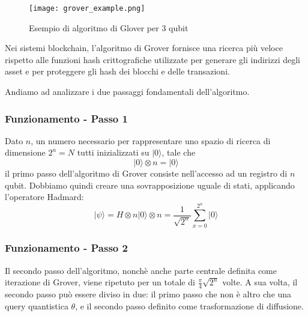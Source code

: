 \begin{figure}[h]
  \centering
  \texttt{[image: grover\_example.png]}
  \caption{Esempio di algoritmo di Glover per 3 qubit}
  \label{fig:grover_example}
\end{figure}

Nei sistemi blockchain, l'algoritmo di Grover fornisce una ricerca più veloce rispetto alle funzioni hash crittografiche utilizzate per generare gli indirizzi degli asset e per proteggere gli hash dei blocchi e delle transazioni.

Andiamo ad analizzare i due passaggi fondamentali dell'algoritmo.
\subsubsection{Funzionamento - Passo 1}
Dato \(n\), un numero necessario per rappresentare uno spazio di ricerca di dimensione \(2^n = N\) tutti inizializzati su \(|0\rangle\), tale che
\[ |0\rangle \otimes n = |0\rangle \]
il primo passo dell'algoritmo di Grover consiste nell'accesso ad un registro di \(n\) qubit. Dobbiamo quindi creare una sovrapposizione uguale di stati, applicando l'operatore Hadmard:
\[ |\psi\rangle = H \otimes n |0\rangle \otimes n = \frac{1}{\sqrt{2^n}} \sum_{x=0}^{2^n} |0\rangle \]

\subsubsection{Funzionamento - Passo 2}
Il secondo passo dell'algoritmo, nonchè anche parte centrale definita come iterazione di Grover, viene ripetuto per un totale di \( \frac{\pi}{4}\sqrt{2^n} \) volte. A sua volta, il secondo passo può essere diviso in due: il primo passo che non è altro che una query quantistica \(\theta\), e il secondo passo definito come trasformazione di diffusione.

